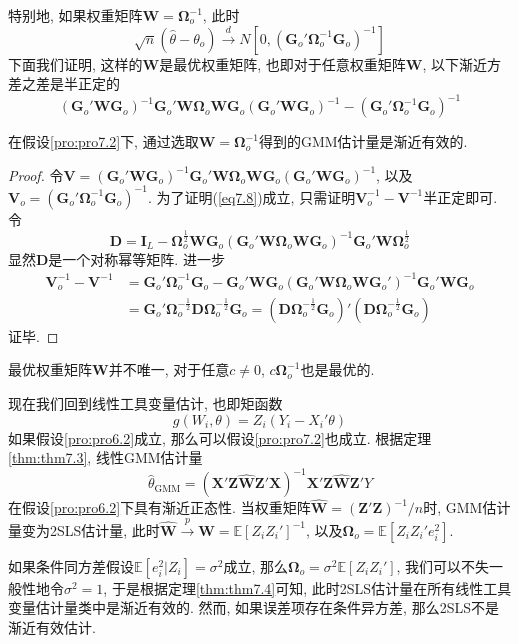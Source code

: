 \documentclass[cn, 12pt, math=mtpro2, bibstyle=apa, blue, twocol]{elegantbook}
\newcommand{\E}{\mathbb{E}}
\newcommand{\W}{\mathbold{W}}
\newcommand{\X}{\mathbold{X}}
\newcommand{\Z}{\mathbold{Z}}
\newcommand{\V}{\mathbold{V}}
\newcommand{\BO}{\mathbold{\Omega}}
\newcommand{\G}{\mathbold{G}}
\begin{document}
特别地, 如果权重矩阵$\W=\BO_o^{-1}$, 此时
$$\sqrt{n}(\hat{\theta}-\theta_o)\xrightarrow{d} N[0, (\mathbold{G}_o'\BO_o^{-1}\mathbold{G}_o)^{-1}]$$
下面我们证明, 这样的$\W$是最优权重矩阵, 也即对于任意权重矩阵$\W$, 以下渐近方差之差是半正定的
\begin{equation}\label{eq7.8}
  (\mathbold{G}_o'\W\mathbold{G}_o)^{-1}\mathbold{G}_o'\W\BO_o\W\mathbold{G}_o(\mathbold{G}_o'\W\mathbold{G}_o)^{-1}-(\mathbold{G}_o'\BO_o^{-1}\mathbold{G}_o)^{-1}
\end{equation}

\begin{theorem}\label{thm:thm7.4}
  在假设\ref{pro:pro7.2}下, 通过选取$\W=\BO_o^{-1}$得到的GMM估计量是渐近有效的.
\end{theorem}
\begin{proof}
  令$\V=(\mathbold{G}_o'\W\mathbold{G}_o)^{-1}\mathbold{G}_o'\W\BO_o\W\mathbold{G}_o(\mathbold{G}_o'\W\mathbold{G}_o)^{-1}$, 以及$\V_o=(\mathbold{G}_o'\BO_o^{-1}\mathbold{G}_o)^{-1}$. 为了证明(\ref{eq7.8})成立, 只需证明$\V_o^{-1}-\V^{-1}$半正定即可. 令
  $$\mathbold{D}=\mathbold{I}_L-\BO_o^{\frac{1}{2}}\W\mathbold{G}_o(\mathbold{G}_o'\W\BO_o\W\mathbold{G}_o)^{-1}\mathbold{G}_o'\W\BO_o^{\frac{1}{2}}$$
  显然$\mathbold{D}$是一个对称幂等矩阵. 进一步
  \begin{align*}
  \V_o^{-1}-\V^{-1}&=\G_o'\BO_o^{-1}\G_o-\G_o'\W\G_o(\G_o'\W\BO_o\W\G_o')^{-1}\G_o'\W\G_o \\
  &=\G_o'\BO_o^{-\frac{1}{2}}\mathbold{D}\BO_o^{-\frac{1}{2}}\G_o=(\mathbold{D}\BO_o^{-\frac{1}{2}}\G_o)'(\mathbold{D}\BO_o^{-\frac{1}{2}}\G_o)
  \end{align*}
  证毕.
\end{proof}
\begin{remark}
最优权重矩阵$\W$并不唯一, 对于任意$c\neq0$, $c\BO_o^{-1}$也是最优的.
\end{remark}
现在我们回到线性工具变量估计, 也即矩函数
$$g(W_i,\theta)=Z_i(Y_i-X_i'\theta)$$
如果假设\ref{pro:pro6.2}成立, 那么可以假设\ref{pro:pro7.2}也成立. 根据定理\ref{thm:thm7.3}, 线性GMM估计量
$$\hat{\theta}_{\text{GMM}}=(\X'\Z\hat{\W}\Z'\X)^{-1}\X'\Z\hat{\W}\Z'Y$$
在假设\ref{pro:pro6.2}下具有渐近正态性. 当权重矩阵$\displaystyle \hat{\W}=(\Z'\Z)^{-1}/n$时, GMM估计量变为2SLS估计量, 此时$\hat{\W}\xrightarrow{p}\W=\E[Z_iZ_i']^{-1}$, 以及$\BO_o=\E[Z_iZ_i'e_i^2]$.

如果条件同方差假设$\E[e_i^2|Z_i]=\sigma^2$成立, 那么$\BO_o=\sigma^2\E[Z_iZ_i']$, 我们可以不失一般性地令$\sigma^2=1$, 于是根据定理\ref{thm:thm7.4}可知, 此时2SLS估计量在所有线性工具变量估计量类中是渐近有效的. 然而, 如果误差项存在条件异方差, 那么2SLS不是渐近有效估计.
\end{document}
